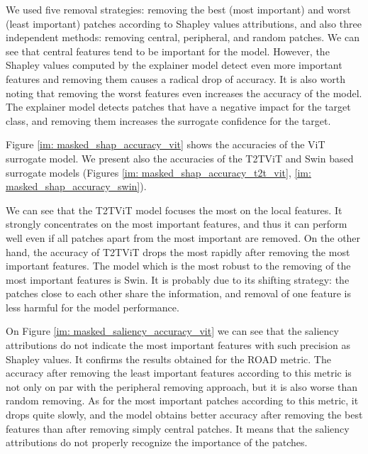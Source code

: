 \documentclass[magisterska,en]{pracamgr}
\begin{document}
We used five removal strategies: removing the best (most important) and worst (least important) patches according to Shapley values attributions, and also three independent methods: removing central, peripheral, and random patches. We can see that central features tend to be important for the model. However, the Shapley values computed by the explainer model detect even more important features and removing them causes a radical drop of accuracy. It is also worth noting that removing the worst features even increases the accuracy of the model. The explainer model detects patches that have a negative impact for the target class, and removing them increases the surrogate confidence for the target.

Figure \ref{im: masked_shap_accuracy_vit} shows the accuracies of the ViT surrogate model. We present also the accuracies of the T2T\textunderscore ViT and Swin based surrogate models (Figures \ref{im: masked_shap_accuracy_t2t_vit}, \ref{im: masked_shap_accuracy_swin}).





We can see that the T2T\textunderscore ViT model focuses the most on the local features. It strongly concentrates on the most important features, and thus it can perform well even if all patches apart from the most important are removed. On the other hand, the accuracy of T2T\textunderscore ViT drops the most rapidly after removing the most important features. The model which is the most robust to the removing of the most important features is Swin. It is probably due to its shifting strategy: the patches close to each other share the information, and removal of one feature is less harmful for the model performance.

On Figure \ref{im: masked_saliency_accuracy_vit} we can see that the saliency attributions do not indicate the most important features with such precision as Shapley values. It confirms the results obtained for the ROAD metric. The accuracy after removing the least important features according to this metric is not only on par with the peripheral removing approach, but it is also worse than random removing. As for the most important patches according to this metric, it drops quite slowly, and the model obtains better accuracy after removing the best features than after removing simply central patches. It means that the saliency attributions do not properly recognize the importance of the patches.
\end{document}
